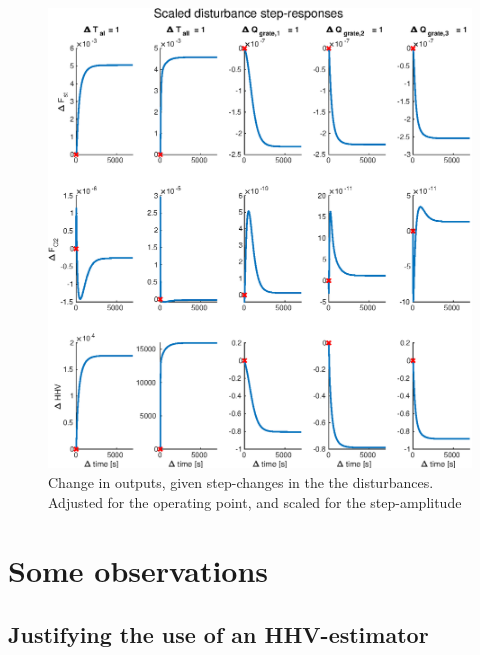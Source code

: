 \begin{figure}[!ht]
    \includegraphics[width=\textwidth]{img/Simple_analysis_plots/Scaled_disturbance_step_responses.eps}
    \caption{Change in outputs, given step-changes in the the disturbances. Adjusted for the operating point, and scaled for the step-amplitude}
    \label{fig:Scaled_disturbance_response}
\end{figure}



\section{Some observations}

\subsection{Justifying the use of an HHV-estimator}

